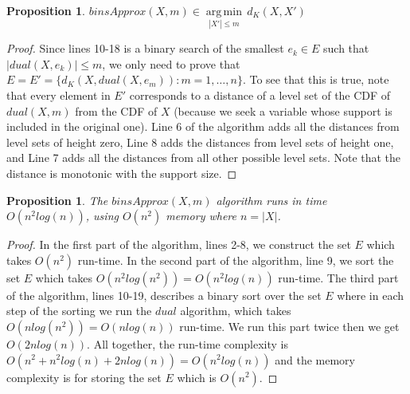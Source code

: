 \documentclass[letterpaper]{article} %
\newtheorem{proposition}[thm]{Proposition}
\begin{document}
\begin{proposition}\label{the:correctnessBinsearch}
	    $binsApprox(X,m) \in \underset{|X'| \leq m }{\operatorname{arg\,min}}\, d_K(X,X')$
\end{proposition}
\begin{proof}
Since lines 10-18 is a binary search of the smallest $e_k\in E$ such that $|dual(X,e_k)|\leq m$, we only need to prove that $E=E'=\{ d_K(X,dual(X,e_m)) \colon m=1,\dots,n\}$. To see that this is true, note that every element in $E'$ corresponds to a distance of a level set of the CDF of $dual(X,m)$ from the CDF of $X$ (because we seek a variable whose support is included in the original one). Line 6 of the algorithm adds all the distances from level sets of height zero, Line 8 adds the distances from level sets of height one, and Line 7 adds all the distances from all other possible level sets. Note that the distance is monotonic with the support size.
\end{proof}

\begin{proposition}\label{the:complexityBinsearch}
	The $binsApprox(X,m)$ algorithm runs in time $O(n^2log(n))$, using $O(n^2)$ memory where $n=|X|$.
\end{proposition}
\begin{proof}
	In the first part of the algorithm, lines 2-8, we construct the set $E$ which takes $O(n^2)$ run-time. In the second part of the algorithm, line 9, we sort the set $E$ which takes $O(n^2log(n^2)) = O(n^2log(n))$  run-time. The third part of the algorithm, lines 10-19, describes a binary sort over the set $E$ where in each step of the sorting we run the $dual$ algorithm, which takes $O(n log(n^2)) = O(n log(n))$ run-time. We run this part twice then we get $O(2n log(n))$. All together, the run-time complexity is $O(n^2+n^2log(n)+2n log(n)) = O(n^2log(n))$ and the memory complexity is for storing the set $E$ which is $O(n^2)$.
\end{proof}
\end{document}
